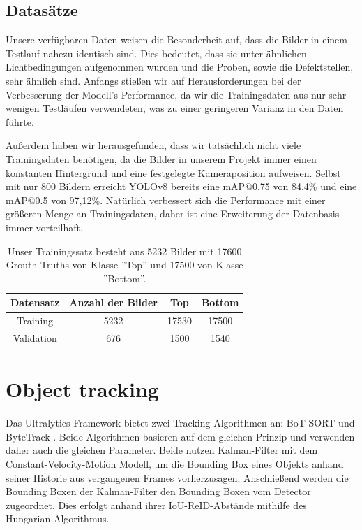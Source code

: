 \subsection{Datasätze}
Unsere verfügbaren Daten weisen die Besonderheit auf, dass die Bilder in einem Testlauf nahezu identisch sind. Dies bedeutet, dass sie unter ähnlichen Lichtbedingungen aufgenommen wurden und die Proben, sowie die Defektstellen, sehr ähnlich sind. Anfangs stießen wir auf Herausforderungen bei der Verbesserung der Modell's Performance, da wir die Trainingsdaten aus nur sehr wenigen Testläufen verwendeten, was zu einer geringeren Varianz in den Daten führte. 

Außerdem haben wir herausgefunden, dass wir tatsächlich nicht viele Trainingsdaten benötigen, da die Bilder in unserem Projekt immer einen konstanten Hintergrund und eine festgelegte Kameraposition aufweisen. Selbst mit nur 800 Bildern erreicht YOLOv8 bereits eine \acs{mAP@0.75} von 84,4\% und eine \acs{mAP@0.5} von 97,12\%. Natürlich verbessert sich die Performance mit einer größeren Menge an Trainingsdaten, daher ist eine Erweiterung der Datenbasis immer vorteilhaft.

\begin{table}[htbp]
    \centering
    \begin{tabular}{cccc}
        Datensatz  & Anzahl der Bilder & Top & Bottom \\
        \midrule
        Training   & 5232 & 17530 & 17500 \\
        Validation & 676  & 1500  & 1540 \\
    \end{tabular}
    \caption{Unser Trainingssatz besteht aus 5232 Bilder mit 17600 Grouth-Truths von Klasse ''Top'' und 17500 von Klasse ''Bottom''.}
    \label{tab:my_label}
\end{table}

\section{Object tracking}
\label{sec:intro:motivation}
Das Ultralytics Framework bietet zwei Tracking-Algorithmen an: BoT-SORT \cite{aharon2022botsort} und ByteTrack \cite{zhang2022bytetrack}. Beide Algorithmen basieren auf dem gleichen Prinzip und verwenden daher auch die gleichen Parameter. Beide nutzen Kalman-Filter mit dem Constant-Velocity-Motion Modell, um die Bounding Box eines Objekts anhand seiner Historie aus vergangenen Frames vorherzusagen. Anschließend werden die Bounding Boxen der Kalman-Filter den Bounding Boxen vom Detector zugeordnet. Dies erfolgt anhand ihrer IoU-ReID-Abstände mithilfe des Hungarian-Algorithmus. 

